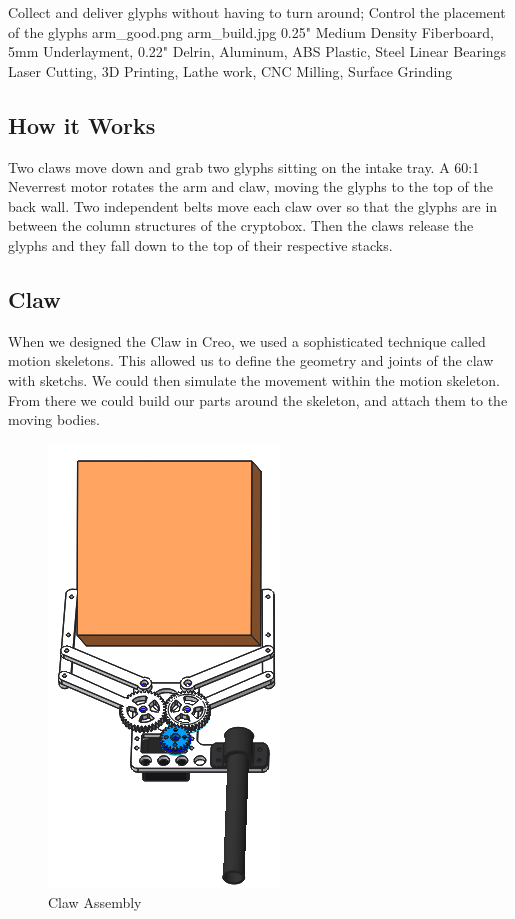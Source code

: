{Collect and deliver glyphs without having to turn around; Control the placement of the glyphs} %
{arm_good.png}%
{arm_build.jpg}%
{0.25" Medium Density Fiberboard, 5mm Underlayment, 0.22" Delrin, Aluminum, ABS Plastic, Steel Linear Bearings}%
{Laser Cutting, 3D Printing, Lathe work, CNC Milling, Surface Grinding}%




\subsection*{How it Works}
Two claws move down and grab two glyphs sitting on the intake tray. A 60:1 Neverrest motor rotates the arm and claw, moving the glyphs to the top of the back wall. Two independent belts move each claw over so that the glyphs are in between the column structures of the cryptobox. Then the claws release the glyphs and they fall down to the top of their respective stacks.

\subsection*{Claw}
When we designed the Claw in Creo, we used a sophisticated technique called motion skeletons. This allowed us to define the geometry and joints of the claw with sketchs. We could then simulate the movement within the motion skeleton. From there we could build our parts around the skeleton, and attach them to the moving bodies.

\begin{figure}[htp]
\centering
\includegraphics[width=.3\linewidth]{Design_Overview/arm_claw.png}
\caption{Claw Assembly}
\label{fig:arm_claw}
\end{figure}

